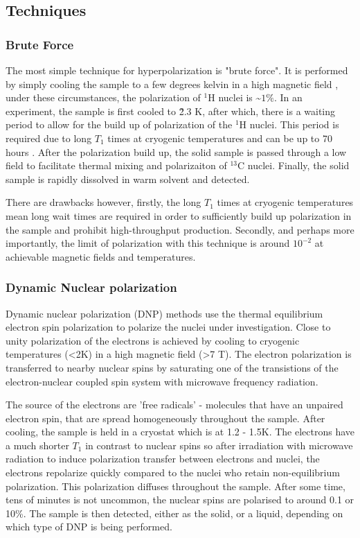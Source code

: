  \subsection{Techniques}

 \subsubsection{Brute Force}

 The most simple technique for hyperpolarization is "brute force". It is performed by simply
 cooling the sample to a few degrees kelvin in a high magnetic field \citep{RN155,RN157}, under
 these circumstances, the polarization of $^1$H nuclei is \~$1\%$. In an experiment, the sample
 is first cooled to \~2.3 K, after which, there is a waiting period to allow for the build up of polarization
 of the $^1$H nuclei. This period is required due to long $T_1$ times at cryogenic temperatures and
 can be up to 70 hours \citep{RN155}. After the polarization build up, the solid sample is passed
 through a low field to facilitate thermal mixing and polarizaiton of $^{13}$C nuclei. Finally,
 the solid sample is rapidly dissolved in warm solvent and detected.

 There are drawbacks however, firstly, the long $T_1$ times at cryogenic temperatures mean long
 wait times are required in order to sufficiently build up polarization in the sample and prohibit high-throughput production.
 Secondly, and perhaps more importantly, the limit of polarization with this technique is around $10^{-2}$ at achievable
 magnetic fields and temperatures.

 \subsubsection{Dynamic Nuclear polarization}

Dynamic nuclear polarization (DNP) methods use the thermal equilibrium electron spin polarization to polarize the nuclei under investigation. Close to unity
polarization of the electrons is achieved by cooling to cryogenic temperatures (<2K) in a high magnetic field (>7 T).
The electron polarization is transferred to nearby nuclear spins by saturating one of the transistions of the electron-nuclear
coupled spin system with microwave frequency radiation.

The source of the electrons are 'free radicals' - molecules that have an unpaired electron spin, that
are spread homogeneously throughout the sample. After cooling, the sample is held in a cryostat which is at
1.2 - 1.5K. The electrons have a much shorter $T_1$ in contrast to nuclear spins so after irradiation with
microwave radiation to induce polarization transfer between electrons and nuclei, the electrons repolarize
quickly compared to the nuclei who retain non-equilibrium polarization. This polarization diffuses throughout the
sample. After some time, tens of minutes is not uncommon, the nuclear spins are polarised to around 0.1 or 10\%. The
sample is then detected, either as the solid, or a liquid, depending on which type of DNP is being performed.


